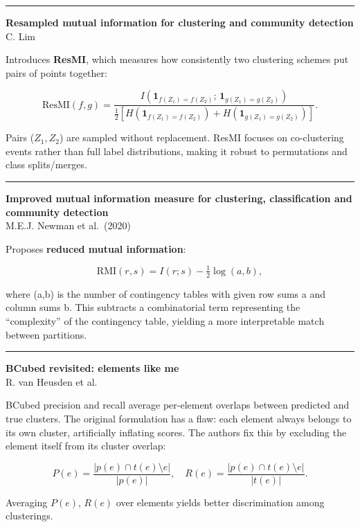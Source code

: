 \documentclass[a5paper]{article}
\begin{document}
\begin{center}\rule{0.5\linewidth}{0.5pt}\end{center}

\textbf{Resampled mutual information for clustering and community
detection}\\
C. Lim

Introduces \textbf{ResMI}, which measures how consistently two
clustering schemes put pairs of points together:

\[ \mathrm{ResMI}(f,g) =
\frac{I( \mathbf{1}_{f(Z_1)=f(Z_2)};\,\mathbf{1}_{g(Z_1)=g(Z_2)})}{\frac12[H(\mathbf{1}_{f(Z_1)=f(Z_2)})+H(\mathbf{1}_{g(Z_1)=g(Z_2)})]}.
\]

Pairs ($Z_1,Z_2$) are sampled without replacement. ResMI focuses on
co-clustering events rather than full label distributions, making it
robust to permutations and class splits/merges.

\begin{center}\rule{0.5\linewidth}{0.5pt}\end{center}

\textbf{Improved mutual information measure for clustering,
classification and community detection}\\
M.E.J. Newman et al.~(2020)

Proposes \textbf{reduced mutual information}:

\[ \mathrm{RMI}(r,s) = I(r;s) - \tfrac12\log(a,b), \]

where (a,b) is the number of contingency tables with given row sums a
and column sums b. This subtracts a combinatorial term representing the
``complexity'' of the contingency table, yielding a more interpretable
match between partitions.

\begin{center}\rule{0.5\linewidth}{0.5pt}\end{center}

\textbf{BCubed revisited: elements like me}\\
R. van Heusden et al.

BCubed precision and recall average per-element overlaps between
predicted and true clusters. The original formulation has a flaw: each
element always belongs to its own cluster, artificially inflating
scores. The authors fix this by excluding the element itself from its
cluster overlap:

\[ P(e) = \frac{|p(e)\cap t(e)\setminus{e}|}{|p(e)|},\quad R(e) =
\frac{|p(e)\cap t(e)\setminus{e}|}{|t(e)|}. \]

Averaging $P(e)$, $R(e)$ over elements yields better discrimination among
clusterings.
\end{document}
